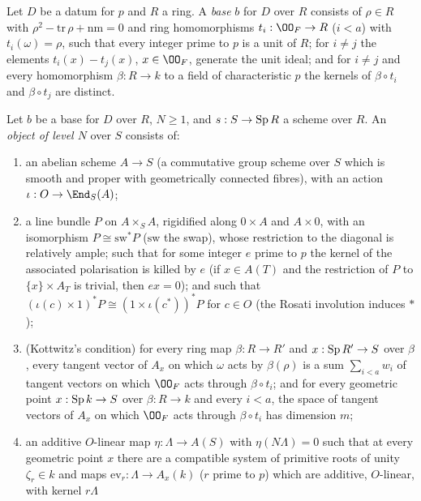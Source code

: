 \begin{definition}\label{pf:ks1:def-base}
Let $D$ be a datum for $p$ and $R$ a ring. A \emph{base} $b$ for $D$ over $R$ consists of $\rho\in R$ with
$\rho^2-\mathrm{tr}\,\rho+\mathrm{nm}=0$ and ring homomorphisms $t_i:\OO_F\to R$ ($i<a$) with $t_i(\omega)=\rho$,
such that every integer prime to $p$ is a unit of $R$; for $i\neq j$ the elements $t_i(x)-t_j(x)$,
$x\in\OO_F$, generate the unit ideal; and for $i\neq j$ and every homomorphism $\beta:R\to k$ to a field of
characteristic $p$ the kernels of $\beta\circ t_i$ and $\beta\circ t_j$ are distinct.
\end{definition}

\begin{definition}\label{pf:ks1:def-obj}
Let $b$ be a base for $D$ over $R$, $N\ge1$, and $s:S\to\operatorname{Sp} R$ a scheme over $R$. An \emph{object of level
$N$} over $S$ consists of:
\begin{enumerate}[label=(O\arabic*)]
\item an abelian scheme $A\to S$ (a commutative group scheme over $S$ which is smooth and proper with
  geometrically connected fibres), with an action $\iota:O\to\End_S(A)$;
\item a line bundle $P$ on $A\times_SA$, rigidified along $0\times A$ and $A\times0$, with an isomorphism
  $P\cong\mathrm{sw}^*P$ ($\mathrm{sw}$ the swap), whose restriction to the diagonal is relatively ample; such
  that for some integer $e$ prime to $p$ the kernel of the associated polarisation is killed by $e$ (if
  $x\in A(T)$ and the restriction of $P$ to $\{x\}\times A_T$ is trivial, then $ex=0$); and such that
  $(\iota(c)\times1)^*P\cong(1\times\iota(c^*))^*P$ for $c\in O$ (the Rosati involution induces $*$);
\item (Kottwitz's condition) for every ring map $\beta:R\to R'$ and $x:\operatorname{Sp} R'\to S$ over $\beta$, every
  tangent vector of $A_x$ on which $\omega$ acts by $\beta(\rho)$ is a sum $\sum_{i<a}w_i$ of tangent vectors on
  which $\OO_F$ acts through $\beta\circ t_i$; and for every geometric point $x:\operatorname{Sp} k\to S$ over
  $\beta:R\to k$ and every $i<a$, the space of tangent vectors of $A_x$ on which $\OO_F$ acts through
  $\beta\circ t_i$ has dimension $m$;
\item an additive $O$-linear map $\eta:\Lambda\to A(S)$ with $\eta(N\Lambda)=0$ such that at every geometric
  point $x$ there are a compatible system of primitive roots of unity $\zeta_r\in k$ and maps
  $\mathrm{ev}_r:\Lambda\to A_x(k)$ ($r$ prime to $p$) which are additive, $O$-linear, with kernel $r\Lambda$

\end{enumerate}
\end{definition}
